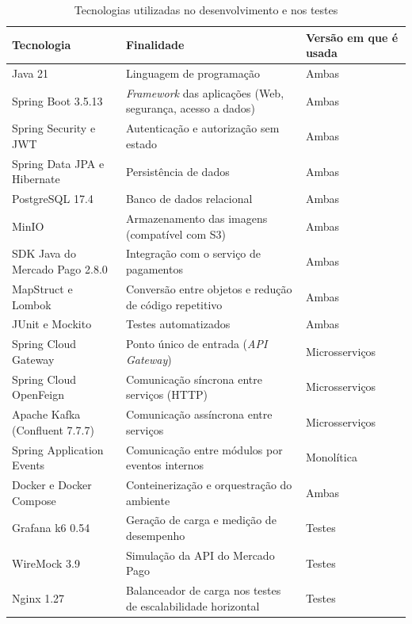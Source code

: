 \begin{table}[htbp]
\centering
\caption{Tecnologias utilizadas no desenvolvimento e nos testes}
\label{tab:tecnologias}
\small
\begin{tabular}{|>{\raggedright\arraybackslash}p{4.4cm}|>{\raggedright\arraybackslash}p{7.4cm}|>{\raggedright\arraybackslash}p{2.8cm}|}
\hline
\textbf{Tecnologia} & \textbf{Finalidade} & \textbf{Versão em que é usada} \\ \hline
Java 21 & Linguagem de programação & Ambas \\ \hline
Spring Boot 3.5.13 &\textit{Framework} das aplicações (Web, segurança, acesso a dados) & Ambas \\ \hline
Spring Security e JWT & Autenticação e autorização sem estado & Ambas \\ \hline
Spring Data JPA e Hibernate & Persistência de dados & Ambas \\ \hline
PostgreSQL 17.4 & Banco de dados relacional & Ambas \\ \hline
MinIO & Armazenamento das imagens (compatível com S3) & Ambas \\ \hline
SDK Java do Mercado Pago 2.8.0 & Integração com o serviço de pagamentos & Ambas \\ \hline
MapStruct e Lombok & Conversão entre objetos e redução de código repetitivo & Ambas \\ \hline
JUnit e Mockito & Testes automatizados & Ambas \\ \hline
Spring Cloud Gateway & Ponto único de entrada (\textit{API Gateway}) & Microsserviços \\ \hline
Spring Cloud OpenFeign & Comunicação síncrona entre serviços (HTTP) & Microsserviços \\ \hline
Apache Kafka (Confluent 7.7.7) & Comunicação assíncrona entre serviços & Microsserviços \\ \hline
Spring Application Events & Comunicação entre módulos por eventos internos & Monolítica \\ \hline
Docker e Docker Compose & Conteinerização e orquestração do ambiente & Ambas \\ \hline
Grafana k6 0.54 & Geração de carga e medição de desempenho \cite{grafana-k6} & Testes \\ \hline
WireMock 3.9 & Simulação da API do Mercado Pago \cite{wiremock} & Testes \\ \hline
Nginx 1.27 & Balanceador de carga nos testes de escalabilidade horizontal & Testes \\ \hline
\end{tabular}
\par\vspace{4pt}{\footnotesize Fonte: Elaborada pelo autor (2026).}
\end{table}

